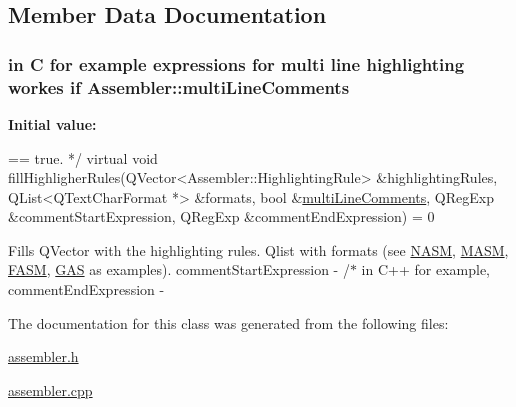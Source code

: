 \subsection{Member Data Documentation}
\hypertarget{class_assembler_a8e2ae531c6d59dfea8c7bb90febda262}{}
\subsubsection[{multi\+Line\+Comments}]{\setlength{\rightskip}{0pt plus 5cm}in C for example expressions for multi line highlighting workes if Assembler\+::multi\+Line\+Comments}\label{class_assembler_a8e2ae531c6d59dfea8c7bb90febda262}
{\bfseries Initial value\+:}
\begin{DoxyCode}
== \textcolor{keyword}{true}. */
    \textcolor{keyword}{virtual} \textcolor{keywordtype}{void} fillHighligherRules(QVector<Assembler::HighlightingRule> &highlightingRules,
                                     QList<QTextCharFormat *> &formats,
                                     \textcolor{keywordtype}{bool} &\hyperlink{class_assembler_a8e2ae531c6d59dfea8c7bb90febda262}{multiLineComments},
                                     QRegExp &commentStartExpression,
                                     QRegExp &commentEndExpression) = 0
\end{DoxyCode}
Fills Q\+Vector with the highlighting rules. Qlist with formats (see \hyperlink{class_n_a_s_m}{N\+A\+S\+M}, \hyperlink{class_m_a_s_m}{M\+A\+S\+M}, \hyperlink{class_f_a_s_m}{F\+A\+S\+M}, \hyperlink{class_g_a_s}{G\+A\+S} as examples). comment\+Start\+Expression -\/ /$\ast$ in C++ for example, comment\+End\+Expression -\/ 

The documentation for this class was generated from the following files\+:\begin{DoxyCompactItemize}
\item 
\hyperlink{assembler_8h}{assembler.\+h}\item 
\hyperlink{assembler_8cpp}{assembler.\+cpp}\end{DoxyCompactItemize}

